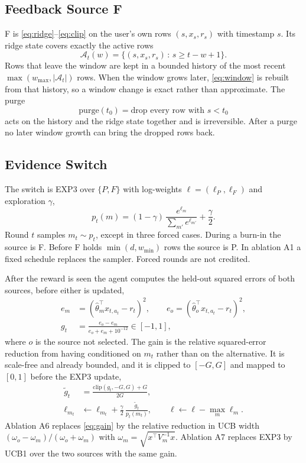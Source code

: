 \subsection{Feedback Source F}
F is \eqref{eq:ridge}--\eqref{eq:clip} on the user's own rows $(s,x_s,r_s)$ with timestamp $s$. Its ridge state covers exactly the active rows
\begin{equation}
\mathcal A_t(w)=\{(s,x_s,r_s)\,:\,s\ge t-w+1\}.
\label{eq:window}
\end{equation}
Rows that leave the window are kept in a bounded history of the most recent $\max(w_{\max},|\mathcal A_t|)$ rows. When the window grows later, \eqref{eq:window} is rebuilt from that history, so a window change is exact rather than approximate. The purge
\begin{equation}
\mathrm{purge}(t_0)=\text{drop every row with } s<t_0
\label{eq:purge}
\end{equation}
acts on the history and the ridge state together and is irreversible. After a purge no later window growth can bring the dropped rows back.

\subsection{Evidence Switch}
The switch is EXP3 \cite{auer2002} over $\{P,F\}$ with log-weights $\ell=(\ell_P,\ell_F)$ and exploration $\gamma$,
\begin{equation}
p_t(m)=(1-\gamma)\,\frac{e^{\ell_m}}{\sum_{m'}e^{\ell_{m'}}}+\frac{\gamma}{2}.
\label{eq:exp3probs}
\end{equation}
Round $t$ samples $m_t\sim p_t$, except in three forced cases. During a burn-in the source is F. Before F holds $\min(d,w_{\min})$ rows the source is P. In ablation A1 a fixed schedule replaces the sampler. Forced rounds are not credited.

After the reward is seen the agent computes the held-out squared errors of both sources, before either is updated,
\begin{align}
e_m&=(\hat\theta_m^\top x_{t,a_t}-r_t)^2,\qquad e_o=(\hat\theta_o^\top x_{t,a_t}-r_t)^2,\nonumber\\
g_t&=\frac{e_o-e_m}{e_o+e_m+10^{-12}}\in[-1,1],
\label{eq:gain}
\end{align}
where $o$ is the source not selected. The gain is the relative squared-error reduction from having conditioned on $m_t$ rather than on the alternative. It is scale-free and already bounded, and it is clipped to $[-G,G]$ and mapped to $[0,1]$ before the EXP3 update,
\begin{align}
\tilde g_t&=\frac{\mathrm{clip}(g_t,-G,G)+G}{2G},\label{eq:rescale}\\
\ell_{m_t}&\leftarrow \ell_{m_t}+\frac{\gamma}{2}\,\frac{\tilde g_t}{p_t(m_t)},\qquad
\ell\leftarrow\ell-\max_m\ell_m.\label{eq:exp3update}
\end{align}
Ablation A6 replaces \eqref{eq:gain} by the relative reduction in UCB width $(\omega_o-\omega_m)/(\omega_o+\omega_m)$ with $\omega_m=\sqrt{x^\top V_m^{-1}x}$. Ablation A7 replaces EXP3 by UCB1 over the two sources with the same gain.

